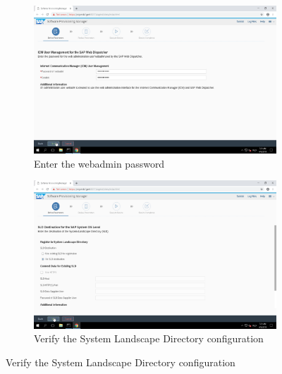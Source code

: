 \begin{figure}[!htb]\ContinuedFloat
    \begin{subfigure}{0.5\textwidth}
        \captionsetup{width=0.8\linewidth}
        \includegraphics[width=0.9\linewidth]{img/Methodologie/SAP12.png}
        \centering
        \caption{Enter the webadmin password}
    \end{subfigure}
    \begin{subfigure}{0.5\textwidth}
        \captionsetup{width=0.8\linewidth}
        \includegraphics[width=0.9\linewidth]{img/Methodologie/SAP11.png} 
        \centering
        \caption{Verify the System Landscape Directory configuration}
    \end{subfigure}
\end{figure}
